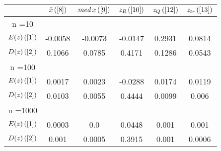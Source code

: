 \begin{tabular}{|c|c|c|c|c|c|}
\hline
 & $\bar{x} \, (\ref{8})$ & $med \, x \, (\ref{9})$ & $z_R \, (\ref{10})$ & $z_Q \, (\ref{12})$ & $z_{tr} \, (\ref{13})$ \\
\hline
n =10 &  &  &  &  & \\
\hline
$E(z) \, (\ref{1})$ & -0.0058 & -0.0073 & -0.0147 & 0.2931 & 0.0814\\
\hline
$D(z) \, (\ref{2})$ & 0.1066 & 0.0785 & 0.4171 & 0.1286 & 0.0543\\
\hline
n =100 &  &  &  &  & \\
\hline
$E(z) \, (\ref{1})$ & 0.0017 & 0.0023 & -0.0288 & 0.0174 & 0.0119\\
\hline
$D(z) \, (\ref{2})$ & 0.0103 & 0.0055 & 0.4444 & 0.0099 & 0.006\\
\hline
n =1000 &  &  &  &  & \\
\hline
$E(z) \, (\ref{1})$ & 0.0003 & 0.0 & 0.0448 & 0.001 & 0.001\\
\hline
$D(z) \, (\ref{2})$ & 0.001 & 0.0005 & 0.3915 & 0.001 & 0.0006\\
\hline
\end{tabular}